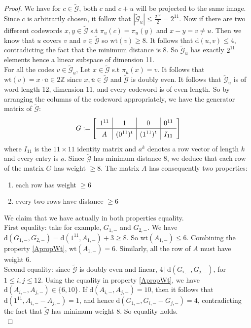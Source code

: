 \documentclass{article}
\numberwithin{equation}{theorem}
\numberwithin{figure}{theorem}
\newcommand{\cCodes}{\ensuremath{\widetilde{\mathscr{G}}}}
\newcommand{\wt}[1]{\ensuremath{\text{wt}(#1)}}
\newcommand{\dist}[2]{\ensuremath{\text{d}(#1,#2)}}
\newcommand{\Integer}{\ensuremath{\mathbb{Z}}}
\begin{document}
\begin{proof}
We have for $c \in \cCodes$, both $c$ and $c + u$ will be projected to the same image. Since $c$ is arbitrarily chosen, it follow that $|\cCodes_u| \leq \frac{2^{12}}{2} = 2^{11}$. Now if there are two different codewords $x,y \in \cCodes$ s.t $\pi_{u}(c) = \pi_{u}(y)$ and $x - y = v \neq u$. Then we know that $u$ covers $v$ and $v \in \cCodes$ so $\wt{v} \geq 8$. It follows that $\dist{u}{v} \leq 4$, contradicting the fact that the minimum distance is 8. So $\cCodes_u$ has exactly $2^{11}$ elements hence a linear subspace of dimension 11.\\
For all the codes $v \in \cCodes_u$, Let $x \in \cCodes$ s.t $\pi_u(x) = v$. It follows that $\wt{v} = x \cdot \bar{u} \in 2\Integer$ since $x, \bar{u} \in \cCodes$ and $\cCodes$ is doubly even. It follows that $\cCodes_u$ is of word length 12, dimension 11, and every codeword is of even length.
So by arranging the columns of the codeword appropriately, we have the generator matrix of \cCodes:
\[
	G := 
\renewcommand\arraystretch{1.3}
\mleft[
\begin{array}{c|c|c|c}
  1^{11} & 1 & 0 & 0^{11} \\
  \hline
  A & (0^{11})^t & (1^{11})^t & I_{11}
\end{array}
\mright]
\]
where $I_{11}$ is the $11 \times 11$ identity matrix and $a^k$ denotes a row vector of length $k$ and every entry is $a$. Since {\cCodes} has minimum distance 8, we deduce that each row
of the matrix $G$ has weight $\geq 8$.
The matrix $A$ has consequently two properties:
\begin{enumerate}
	\item each row has weight $\geq 6$ \label{ApropWt}
	\item every two rows have distance $\geq 6$ \label{ArowDist}
\end{enumerate}
We claim that we have actually in both properties equality.\\
First equality: take for example, $G_{1,-}$ and $G_{2,-}$. We have $\dist{G_{1,-}}{G_{2,-}} = \dist{1^{11}}{A_{1,-}} + 3 \geq 8$. So $\wt{A_{1,-}} \leq 6$. Combining the property \ref{ApropWt}, $\wt{A_{1,-}} = 6$. Similarly, all the row of $A$ must have weight 6.\\
Second equality: since {\cCodes} is doubly even and linear, $4 \,|\, \dist{G_{i,-}}{G_{j,-}}$, for $1 \leq i,j \leq 12$. Using the equality in property \ref{ApropWt}, we have $\dist{A_{i,-}}{A_{j,-}} \in \{ 6, 10 \}$. If $\dist{A_{i,-}}{A_{j,-}} = 10$, then it follows that $\dist{1^{11}}{A_{i,-} - A_{j,-}} = 1$, and hence $\dist{G_{1,-}}{G_{i,-}- G_{j,-}} = 4$, contradicting the fact that {\cCodes} has minimum weight 8. So equality holds.\\

\end{proof}
\end{document}
